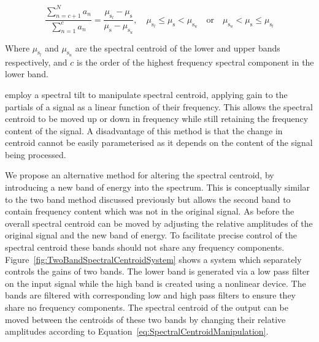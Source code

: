 			\begin{equation}
				\frac{\sum_{n = c + 1}^{N} a_{n}}
				     {{\sum_{n = 1}^{c} a_{n}}} = 
				\frac{\mu_{\mathrm{s}_{l}} - \mu_{\mathrm{s}}}{\mu_{\mathrm{s}} - \mu_{\mathrm{s}_{u}}}, 
				\quad \mu_{\mathrm{s}_{l}} \leq \mu_{\mathrm{s}} < \mu_{\mathrm{s}_{u}} \quad \text{or} 
					\quad \mu_{\mathrm{s}_{u}} < \mu_{\mathrm{s}} \leq \mu_{\mathrm{s}_{l}}
				\label{eq:SpectralCentroidManipulation}
			\end{equation}

			Where $\mu_{\mathrm{s}_{l}}$ and $\mu_{\mathrm{s}_{u}}$ are the spectral centroid of the lower and
			upper bands respectively, and $c$ is the order of the highest frequency spectral component in the
			lower band.

			\citet{williams2007perceptually} employ a spectral tilt to manipulate spectral centroid, applying
			gain to the partials of a signal as a linear function of their frequency. This allows the spectral
			centroid to be moved up or down in frequency while still retaining the frequency content of the
			signal. A disadvantage of this method is that the change in centroid cannot be easily parameterised
			as it depends on the content of the signal being processed.

			We propose an alternative method for altering the spectral centroid, by introducing a new band of
			energy into the spectrum.  This is conceptually similar to the two band method discussed previously
			but allows the second band to contain frequency content which was not in the original signal. As
			before the overall spectral centroid can be moved by adjusting the relative amplitudes of the
			original signal and the new band of energy. To facilitate precise control of the spectral centroid
			these bands should not share any frequency components.
			Figure~\ref{fig:TwoBandSpectralCentroidSystem} shows a system which separately controls the gains
			of two bands. The lower band is generated via a low pass filter on the input signal while the high
			band is created using a nonlinear device. The bands are filtered with corresponding low and high
			pass filters to ensure they share no frequency components. The spectral centroid of the output can
			be moved between the centroids of these two bands by changing their relative amplitudes according
			to Equation~\ref{eq:SpectralCentroidManipulation}.

